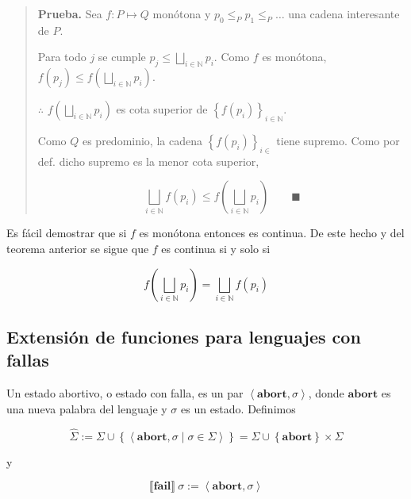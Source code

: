 \documentclass[a4paper, 12pt]{article}
\begin{document}
\small
\begin{quote}

\textbf{Prueba.} Sea $f : P \mapsto Q$ monótona y $p_0 \leq_P p_1 \leq_P \ldots$
una cadena interesante de $P$.  

Para todo $j$ se cumple $p_j \leq \bigsqcup_{i \in \mathbb{N}} p_i$. Como $f$ es
monótona, $f(p_j) \leq f\left( \bigsqcup_{i \in \mathbb{N}} p_i \right) $. 

$\therefore $ $f\left( \bigsqcup_{i \in \mathbb{N}} p_i \right) $ es cota
superior de $\left\{ f(p_i) \right\}_{i \in \mathbb{N}} $.

Como $Q$ es predominio, la cadena $\left\{ f(p_i) \right\}_{i \in \mathbb{}} $
tiene supremo. Como por def. dicho supremo es la menor cota superior,

\begin{equation*}
  \bigsqcup_{i \in \mathbb{N}} f(p_i) \leq f \left( \bigsqcup_{i \in \mathbb{N}}
  p_i\right) \qquad \blacksquare
\end{equation*}



\end{quote}
\normalsize

Es fácil demostrar que si $f$ es monótona entonces es continua. De este hecho y
del teorema anterior se sigue que $f$ es continua si y solo si 

\begin{equation*}
  f\left( \bigsqcup_{i \in \mathbb{N}} p_i \right) = \bigsqcup_{i \in
  \mathbb{N}} f(p_i)
\end{equation*}


\subsection{Extensión de funciones para lenguajes con fallas}

Un estado abortivo, o estado con falla, es un par $\left<\textbf{abort}, \sigma
\right>$, donde $\textbf{abort}$ es una nueva palabra del lenguaje y $\sigma$
es un estado. Definimos

\begin{equation*}
  \hat{ \Sigma }  := \Sigma \cup \left\{ \left<\textbf{abort}, \sigma \mid
  \sigma \in \Sigma\right> \right\} = \Sigma \cup  \left\{ \textbf{abort}
  \right\}  \times \Sigma
\end{equation*}

y

\begin{equation*}
  \llbracket \textbf{fail} \rrbracket ~ \sigma := \left<\textbf{abort}, \sigma \right>
\end{equation*}
\end{document}
